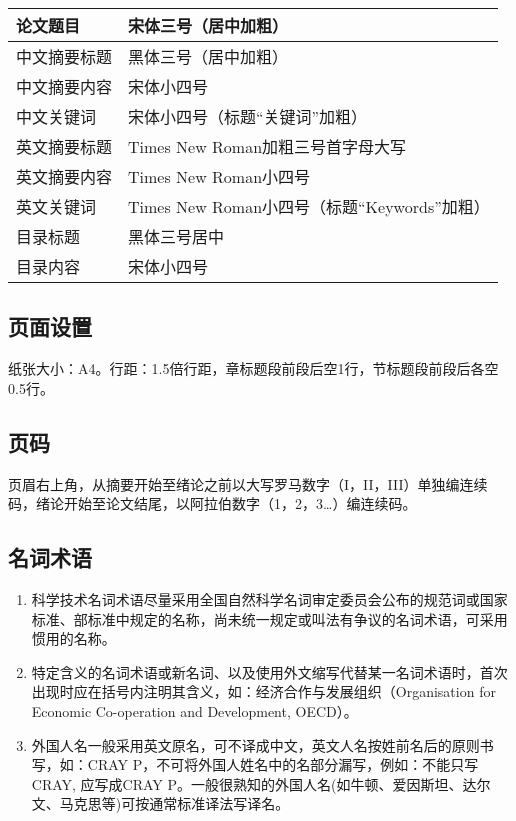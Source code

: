 \begin{center}
    \begin{tabular}{|l|l|}
        \hline
        论文题目        & 宋体三号（居中加粗）                             \\ \hline
        中文摘要标题      & 黑体三号（居中加粗）                           \\ \hline
        中文摘要内容      & 宋体小四号                              \\ \hline
        中文关键词       & 宋体小四号（标题“关键词”加粗）                   \\ \hline
        英文摘要标题      & Times New Roman加粗三号首字母大写            \\ \hline
        英文摘要内容      & Times New Roman小四号                 \\ \hline
        英文关键词       & Times New Roman小四号（标题“Keywords”加粗） \\ \hline
        目录标题        & 黑体三号居中                             \\ \hline
        目录内容        & 宋体小四号                              \\ \hline
    \end{tabular}
\end{center}

\subsection{页面设置}

纸张大小：A4。行距：1.5倍行距，章标题段前段后空1行，节标题段前段后各空0.5行。

\subsection{页码}

页眉右上角，从摘要开始至绪论之前以大写罗马数字（I，II，III）单独编连续码，绪论开始至论文结尾，以阿拉伯数字（1，2，3…）编连续码。

\subsection{名词术语}

\begin{enumerate}
    \item 科学技术名词术语尽量采用全国自然科学名词审定委员会公布的规范词或国家标准、部标准中规定的名称，尚未统一规定或叫法有争议的名词术语，可采用惯用的名称。
    \item 特定含义的名词术语或新名词、以及使用外文缩写代替某一名词术语时，首次出现时应在括号内注明其含义，如：经济合作与发展组织（Organisation for Economic Co-operation and Development, OECD）。
    \item 外国人名一般采用英文原名，可不译成中文，英文人名按姓前名后的原则书写，如：CRAY P，不可将外国人姓名中的名部分漏写，例如：不能只写CRAY, 应写成CRAY P。一般很熟知的外国人名(如牛顿、爱因斯坦、达尔文、马克思等)可按通常标准译法写译名。
\end{enumerate}

